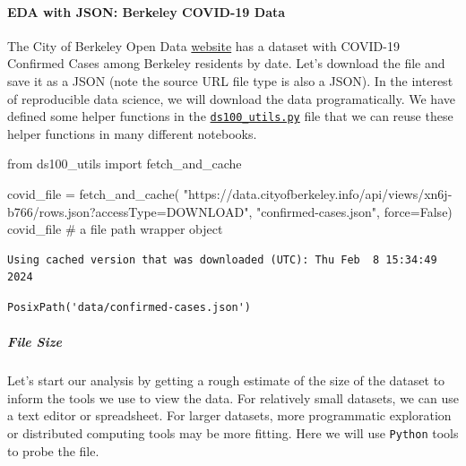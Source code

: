\documentclass[
  letterpaper,
  DIV=11,
  numbers=noendperiod]{scrreprt}
\let\oldparagraph\paragraph
\renewcommand{\paragraph}[1]{\oldparagraph{#1}\mbox{}}
\let\oldsubparagraph\subparagraph
\renewcommand{\subparagraph}[1]{\oldsubparagraph{#1}\mbox{}}
\newenvironment{Shaded}{\begin{snugshade}}{\end{snugshade}}
\newcommand{\CommentTok}[1]{\textcolor[rgb]{0.37,0.37,0.37}{#1}}
\newcommand{\ImportTok}[1]{\textcolor[rgb]{0.00,0.46,0.62}{#1}}
\newcommand{\NormalTok}[1]{\textcolor[rgb]{0.00,0.23,0.31}{#1}}
\newcommand{\OperatorTok}[1]{\textcolor[rgb]{0.37,0.37,0.37}{#1}}
\newcommand{\StringTok}[1]{\textcolor[rgb]{0.13,0.47,0.30}{#1}}
\newcommand{\VariableTok}[1]{\textcolor[rgb]{0.07,0.07,0.07}{#1}}
\begin{document}
\paragraph{EDA with JSON: Berkeley COVID-19
Data}\label{eda-with-json-berkeley-covid-19-data}

The City of Berkeley Open Data
\href{https://data.cityofberkeley.info/Health/COVID-19-Confirmed-Cases/xn6j-b766}{website}
has a dataset with COVID-19 Confirmed Cases among Berkeley residents by
date. Let's download the file and save it as a JSON (note the source URL
file type is also a JSON). In the interest of reproducible data science,
we will download the data programatically. We have defined some helper
functions in the
\href{https://ds100.org/fa23/resources/assets/lectures/lec05/lec05-eda.html}{\texttt{ds100\_utils.py}}
file that we can reuse these helper functions in many different
notebooks.

\begin{Shaded}
\begin{Highlighting}[]
\ImportTok{from}\NormalTok{ ds100\_utils }\ImportTok{import}\NormalTok{ fetch\_and\_cache}

\NormalTok{covid\_file }\OperatorTok{=}\NormalTok{ fetch\_and\_cache(}
    \StringTok{"https://data.cityofberkeley.info/api/views/xn6j{-}b766/rows.json?accessType=DOWNLOAD"}\NormalTok{,}
    \StringTok{"confirmed{-}cases.json"}\NormalTok{,}
\NormalTok{    force}\OperatorTok{=}\VariableTok{False}\NormalTok{)}
\NormalTok{covid\_file          }\CommentTok{\# a file path wrapper object}
\end{Highlighting}
\end{Shaded}

\begin{verbatim}
Using cached version that was downloaded (UTC): Thu Feb  8 15:34:49 2024
\end{verbatim}

\begin{verbatim}
PosixPath('data/confirmed-cases.json')
\end{verbatim}

\subparagraph{File Size}\label{file-size}

Let's start our analysis by getting a rough estimate of the size of the
dataset to inform the tools we use to view the data. For relatively
small datasets, we can use a text editor or spreadsheet. For larger
datasets, more programmatic exploration or distributed computing tools
may be more fitting. Here we will use \texttt{Python} tools to probe the
file.
\end{document}

